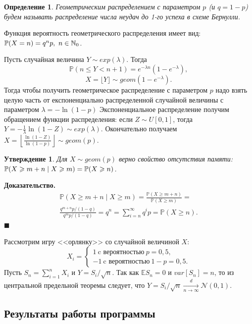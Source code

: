 \documentclass[12pt, a4paper]{article} %
\renewcommand{\le}{\leqslant}
\renewcommand{\ge}{\geqslant}
\def\Pro{\mathbb{P}} %
\def\Nat{\mathbb{N}} %
\def\Expec{\mathbb{E}} %
\def\Norm{\mathcal{N}} %
\newcommand*{\hm}[1]{#1\nobreak\discretionary{}%
            {\hbox{\mathsurround=0pt #1}}{}}
\newtheorem{St}{Утверждение}
\newtheorem{Def}{Определение}
\newenvironment{Proof}{\par\textbf{Доказательство. }}
	{\hfill$\blacksquare$\vspace{0.1cm}}
\begin{document}
\begin{Def}
    Геометрическим распределением с параметром $p$ (и $q = 1 - p$) будем 
    называть распределение числа неудач до 1-го успеха в схеме Бернулли.
\end{Def}
Функция вероятность геометрического распределения имеет вид: 
$\Pro (X \hm= n) = q^np,\ n \in \Nat_0$.

Пусть случайная величина $Y \sim exp(\lambda)$.
Тогда 
$$
\Pro(n \le Y < n + 1) = e^{-\lambda n} \left(1 - e^{-\lambda}\right),
$$
\[
   X = \lfloor Y \rfloor \sim geom(1 - e^{-\lambda}).
\] 
Тогда чтобы получить геометрическое распределение с параметром $p$ надо 
взять целую часть от експоненциально распределенной случайной величины с параметром  $\lambda = -\ln(1 - p)$
Экспоненциальное распределение получим обращением функции распределения:
если $Z \sim U[0, 1]$, тогда $Y = -\frac{1}{\lambda} \ln(1 - Z) \sim exp(\lambda)$.
Окончательно получаем $X = \left\lfloor \frac{\ln(1 - Z)}{\ln(1 - p)} \right\rfloor\sim geom(p)$.

\begin{St}
    Для $X \sim geom(p)$ верно свойство отсутствия памяти:
    $\Pro (X \ge m + n \mid X \ge m) \hm= \Pro(X \ge n)$.
\end{St}
\begin{Proof}
    \begin{multline*}
        \Pro (X \ge m + n \mid X \ge m) =
        \frac{\Pro(X \ge m + n)}{\Pro(X \ge m)} =\\
        \frac{q^{m + n}p / (1 - q)}{q^{m}p / (1 - q)} = q^{n} =
        \sum\limits_{i=n}^{\infty} q^{i}p = 
        \Pro(X \ge n).
    \end{multline*} 
\end{Proof} 

Рассмотрим игру <<орлянку>> со случайной величиной $X$:
\[
    X_i =
    \begin{cases}
        1\ \text{c вероятностью}\ p = 0{,}5, \\
        -1\ \text{c вероятностью}\ 1 - p = 0{,}5.
    \end{cases} 
\] 
Пусть  $S_n = \sum\limits_{i=1}^{n} X_i$ и $Y = S_i /\!\sqrt{n}$.
Так как $\Expec S_n = 0$ и  $var[S_n] = n$, то из центральной предельной теоремы следует,
что $Y = S_i /\!\sqrt{n} \xrightarrow[n \rightarrow \infty]{d}  \Norm(0, 1)$.

\subsection{Результаты работы программы}
\end{document}
